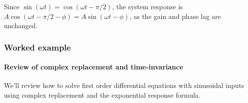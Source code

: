 Since $\sin (\omega t) = \cos (\omega t - \pi /2)$, the system response is
$A\cos (\omega t - \pi /2 - \phi ) = A\sin (\omega t - \phi )$,
as the gain and phase lag are unchanged.
\clearpage

\subsubsection{Worked example}
\paragraph{Review of complex replacement and time-invariance}
We'll review how to solve first order differential equations
with sinusoidal inputs using complex replacement and the exponential response formula.\\

